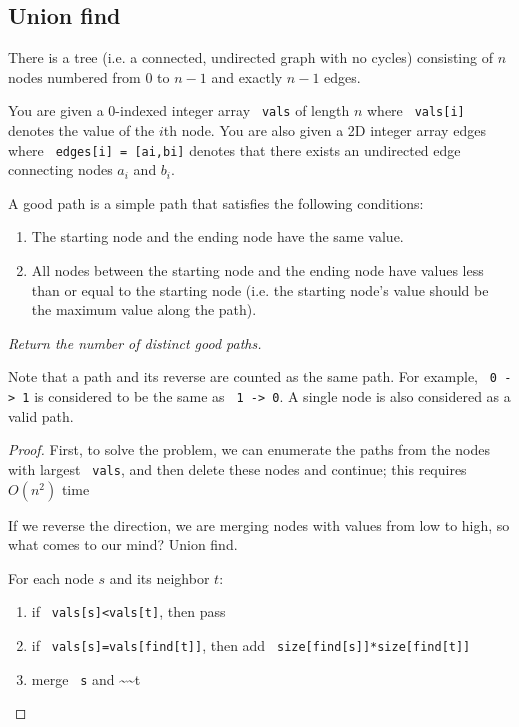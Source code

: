 \documentclass[11pt]{article}
\let\OldTexttt\texttt
\renewcommand{\texttt}[1]{\OldTexttt{\color{MidnightBlue} #1}}
\begin{document}
\subsection{Union find}
\label{sec:org4ef00cf}
\begin{problem}
There is a tree (i.e. a connected, undirected graph with no cycles) consisting of \(n\) nodes
numbered from 0 to \(n-1\) and exactly \(n - 1\) edges.

You are given a 0-indexed integer array \texttt{vals} of length \(n\) where \texttt{vals[i]} denotes the value of the
\(i\)th node. You are also given a 2D integer array edges where \texttt{edges[i] = [ai,bi]} denotes that
there exists an undirected edge connecting nodes \(a_i\) and \(b_i\).

A good path is a simple path that satisfies the following conditions:
\begin{enumerate}
\item The starting node and the ending node have the same value.
\item All nodes between the starting node and the ending node have values less than or equal to the
starting node (i.e. the starting node's value should be the maximum value along the path).
\end{enumerate}

\emph{Return the number of distinct good paths.}

Note that a path and its reverse are counted as the same path. For example, \texttt{0 -> 1} is considered
to be the same as \texttt{1 -> 0}. A single node is also considered as a valid path.
\end{problem}

\begin{proof}
First, to solve the problem, we can enumerate the paths from the nodes with largest \texttt{vals}, and
then delete these nodes and continue; this requires \(O(n^2)\) time

If we reverse the direction, we are merging nodes with values from low to high, so what comes to
our mind? Union find.

For each node \(s\) and its neighbor \(t\):
\begin{enumerate}
\item if \texttt{vals[s]<vals[t]}, then pass
\item if \texttt{vals[s]=vals[find[t]]}, then add \texttt{size[find[s]]*size[find[t]]}
\item merge \texttt{s} and \textasciitilde{}\textasciitilde{}t
\end{enumerate}
\end{proof}
\end{document}
